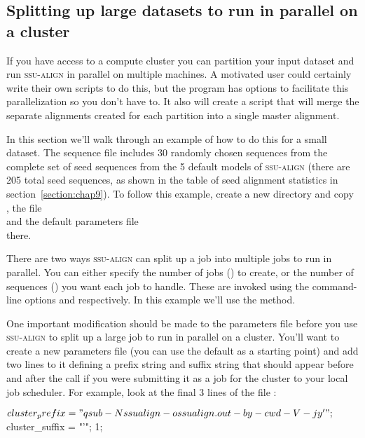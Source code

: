 \subsection{Splitting up large datasets to run in parallel on a cluster}

If you have access to a compute cluster you can partition your input
dataset and run \textsc{ssu-align} in parallel on multiple machines. A
motivated user could certainly write their own scripts to do this, but
the  program has options to facilitate this
parallelization so you don't have to.  It also will create a script
that will merge the separate alignments created for each partition
into a single master alignment.

In this section we'll walk through an example of how to do this for a
small dataset.  The sequence file  includes
30 randomly chosen sequences from the complete set of seed sequences
from the 5 default models of \textsc{ssu-align} (there are 205 total
seed sequences, as shown in the table of seed alignment statistics in
section~\ref{section:chap9}). To follow this example, create a new
directory and copy , the file
\\  and the default parameters file
\\  there.

There are two ways \textsc{ssu-align} can split up a job into multiple
jobs to run in parallel. You can either specify the number of jobs
() to create, or the number of sequences () you
want each job to handle. These are invoked using the command-line
options  and  respectively.  In this example
we'll use the  method.

One important modification should be made to the parameters file
before you use \textsc{ssu-align} to split up a large job to run in
parallel on a cluster. You'll want to create a new parameters file
(you can use the default  as a starting point) and
add two lines to it defining a prefix string and suffix string that
should appear before and after the  call if you were
submitting it as a job for the cluster to your local job
scheduler. For example, look at the final 3 lines of the file
:

\begin{sreoutput}
$cluster_prefix = "qsub -N ssualign -o ssualign.out -b y -cwd -V -j y '";
$cluster_suffix = "'";
1;
\end{sreoutput}

